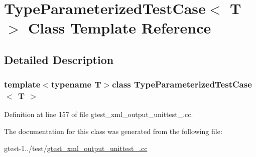 \hypertarget{classTypeParameterizedTestCase}{\section{\-Type\-Parameterized\-Test\-Case$<$ \-T $>$ \-Class \-Template \-Reference}
\label{d7/d37/classTypeParameterizedTestCase}
}


\subsection{\-Detailed \-Description}
\subsubsection*{template$<$typename T$>$class Type\-Parameterized\-Test\-Case$<$ T $>$}



\-Definition at line 157 of file gtest\-\_\-xml\-\_\-output\-\_\-unittest\-\_\-.\-cc.



\-The documentation for this class was generated from the following file\-:\begin{DoxyCompactItemize}
\item 
gtest-\/1../test/\hyperlink{gtest__xml__output__unittest___8cc}{gtest\-\_\-xml\-\_\-output\-\_\-unittest\-\_\-.\-cc}\end{DoxyCompactItemize}

